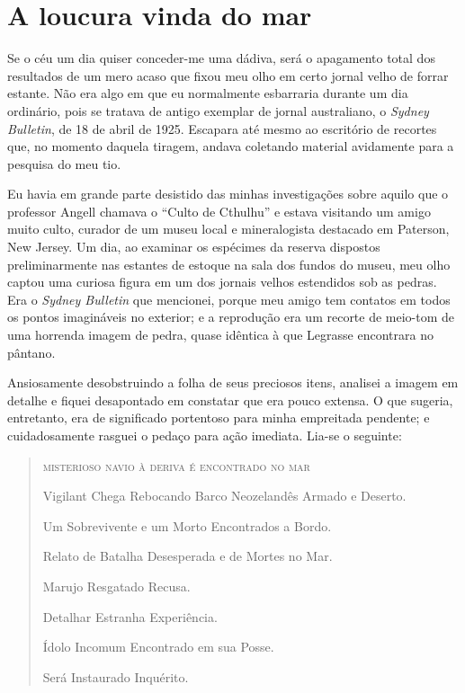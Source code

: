 \chapter{A loucura vinda do mar}

\noindent{}Se o céu um dia quiser conceder-me uma dádiva, será o apagamento total
dos resultados de um mero acaso que fixou meu olho em certo jornal velho
de forrar estante. Não era algo em que eu normalmente esbarraria durante
um dia ordinário, pois se tratava de antigo exemplar de jornal
australiano, o \emph{Sydney Bulletin}, de 18 de abril de 1925. Escapara
até mesmo ao escritório de recortes que, no momento daquela tiragem,
andava coletando material avidamente para a pesquisa do meu tio.

Eu havia em grande parte desistido das minhas investigações sobre aquilo
que o professor Angell chamava o ``Culto de Cthulhu'' e estava
visitando um amigo muito culto, curador de um museu local e
mineralogista destacado em Paterson, New Jersey. Um dia, ao examinar os
espécimes da reserva dispostos preliminarmente nas estantes de estoque
na sala dos fundos do museu, meu olho captou uma curiosa figura em um
dos jornais velhos estendidos sob as pedras. Era o \emph{Sydney
Bulletin} que mencionei, porque meu amigo tem contatos em todos os
pontos imagináveis no exterior; e a reprodução era um recorte de
meio-tom de uma horrenda imagem de pedra, quase idêntica à que Legrasse
encontrara no pântano.

Ansiosamente desobstruindo a folha de seus preciosos itens, analisei 
a imagem em detalhe e fiquei desapontado em constatar que era pouco extensa. 
O que sugeria, entretanto, era de significado portentoso para minha
empreitada pendente; e cuidadosamente rasguei o pedaço para ação
imediata. Lia-se o seguinte:

\begin{quote}
\textsc{misterioso navio à deriva é encontrado no mar}

\smallskip

Vigilant Chega Rebocando Barco Neozelandês Armado e Deserto.

Um Sobrevivente e um Morto Encontrados a Bordo.

Relato de Batalha Desesperada e de Mortes no Mar.

Marujo Resgatado Recusa.

Detalhar Estranha Experiência.

Ídolo Incomum Encontrado em sua Posse.

Será Instaurado Inquérito.
\end{quote}

